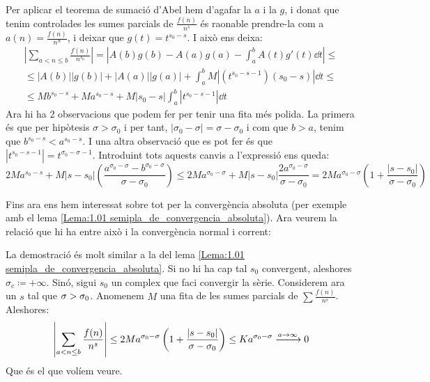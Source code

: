 \begin{pf}
    Per aplicar el teorema de sumació d'Abel hem d'agafar la $a$ i la $g$, i donat que tenim controlades les sumes parcials de $\frac{f(n)}{n^s}$ és raonable prendre-la com a $a(n)=\frac{f(n)}{n^S}$, i deixar que $g(t)=t^{s_{0}-s}$. I això ens deixa:
    \begin{align*}    
    \left|\sum_{a<n\leq b}\frac{f(n)}{n^{s_0}}\right|=\left|A(b)g(b)-A(a)g(a)-\int_a^bA(t)g'(t)\dd t\right|\leq\\
    \leq |A(b)||g(b)|+|A(a)||g(a)|+\int_a^b M \left|\left(t^{s_0-s-1}\right)(s_0-s)\right| \dd t\leq\\
    \leq Mb^{s_0-s}+Ma^{s_0-s}+M|s_0-s|\int_{a}^b\left|t^{s_0-s-1}\right|\dd t
    \end{align*}
    Ara hi ha 2 observacions que podem fer per tenir una fita més polida. La primera és que per hipòtesis $\sigma>\sigma_0$ i per tant, $|\sigma_0-\sigma|=\sigma-\sigma_0$ i com que $b>a$, tenim que $b^{s_0-s}<a^{s_0-s}$. I una altra observació que es pot fer és que $\left|t^{s_0-s-1}\right|=t^{\sigma_0-\sigma-1}$. Introduint tots aquests canvis a l'expressió ens queda:
    \[
    2Ma^{s_0-s}+M|s-s_0|\left(\frac{a^{\sigma_0-\sigma}-b^{\sigma_0-\sigma}}{\sigma-\sigma_0}\right)\leq2Ma^{\sigma_0-\sigma}+M|s-s_0|\frac{2a^{\sigma_0-\sigma}}{\sigma-\sigma_0}=2Ma^{\sigma_0-\sigma}\left(1+\frac{|s-s_0|}{\sigma-\sigma_0}\right)
    \]
\end{pf}
Fins ara ens hem interessat sobre tot per la convergència absoluta (per exemple amb el lema \ref{Lema:1.01 semipla_de_convergencia_absoluta}). Ara veurem la relació que hi ha entre això i la convergència normal i corrent:
\begin{pf}
    La demostració és molt similar a la del lema \ref{Lema:1.01 semipla_de_convergencia_absoluta}. Si no hi ha cap tal $s_0$ convergent, aleshores $\sigma_c\coloneq+\infty$. Sinó, sigui $s_0$ un complex que faci convergir la sèrie. Considerem ara un $s$ tal que $\sigma>\sigma_0$. Anomenem $M$ una fita de les sumes parcials de $\sum \frac{f(n)}{n^s}$. Aleshores:
    \[
    \left|\sum_{a<n\leq b}\frac{f(n)}{n^s}\right|\leq2Ma^{\sigma_0-\sigma}\left(1+\frac{|s-s_0|}{\sigma-\sigma_0}\right)\leq Ka^{\sigma_0-\sigma}\xrightarrow{a\rightarrow\infty}0
    \]
    Que és el que volíem veure.
\end{pf}

